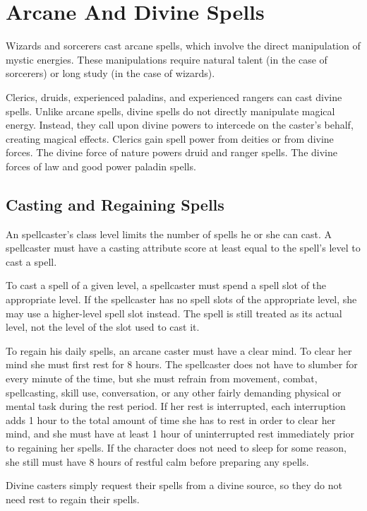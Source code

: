 \section{Arcane And Divine Spells}
Wizards and sorcerers cast arcane spells, which involve the direct manipulation of mystic energies. These manipulations require natural talent (in the case of sorcerers) or long study (in the case of wizards).

Clerics, druids, experienced paladins, and experienced rangers can cast divine spells. Unlike arcane spells, divine spells do not directly manipulate magical energy. Instead, they call upon divine powers to intercede on the caster's behalf, creating magical effects. Clerics gain spell power from deities or from divine forces. The divine force of nature powers druid and ranger spells. The divine forces of law and good power paladin spells.

\subsection{Casting and Regaining Spells}
An spellcaster's class level limits the number of spells he or she can cast. A spellcaster must have a casting attribute score at least equal to the spell's level to cast a spell.

 To cast a spell of a given level, a spellcaster must spend a spell slot of the appropriate level. If the spellcaster has no spell slots of the appropriate level, she may use a higher-level spell slot instead. The spell is still treated as its actual level, not the level of the slot used to cast it. 

 To regain his daily spells, an arcane caster must have a clear mind. To clear her mind she must first rest for 8 hours. The spellcaster does not have to slumber for every minute of the time, but she must refrain from movement, combat, spellcasting, skill use, conversation, or any other fairly demanding physical or mental task during the rest period. If her rest is interrupted, each interruption adds 1 hour to the total amount of time she has to rest in order to clear her mind, and she must have at least 1 hour of uninterrupted rest immediately prior to regaining her spells. If the character does not need to sleep for some reason, she still must have 8 hours of restful calm before preparing any spells.

Divine casters simply request their spells from a divine source, so they do not need rest to regain their spells.

